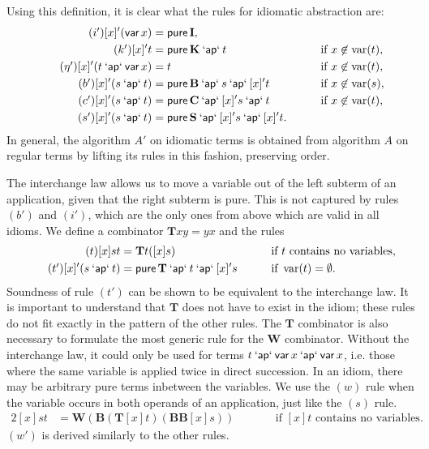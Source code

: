 Using this definition, it is clear what the rules for idiomatic abstraction
are:
\begin{alignat}{2}
	\tag{$i'$} [x]'(\operatorname{\mathsf{var}} x) &= \operatorname{\mathsf{pure}} \mathbf{I}, && \\
	\tag{$k'$} [x]'t &= \operatorname{\mathsf{pure}} \mathbf{K} \mathbin{\mathsf{`ap`}} t &&\qquad\text{if } x \not\in \operatorname{var}(t), \\
	\tag{$\eta'$} [x]'(t \mathbin{\mathsf{`ap`}} \operatorname{\mathsf{var}} x) &= t &&\qquad\text{if } x \not\in\operatorname{var}(t), \\
	\tag{$b'$} [x]'(s \mathbin{\mathsf{`ap`}} t) &= \operatorname{\mathsf{pure}} \mathbf{B} \mathbin{\mathsf{`ap`}} s \mathbin{\mathsf{`ap`}} [x]'t &&\qquad\text{if } x \not\in \operatorname{var}(s), \\
	\tag{$c'$} [x]'(s \mathbin{\mathsf{`ap`}} t) &= \operatorname{\mathsf{pure}} \mathbf{C} \mathbin{\mathsf{`ap`}} [x]'s \mathbin{\mathsf{`ap`}} t &&\qquad\text{if } x \not\in \operatorname{var}(t), \\
	\tag{$s'$} [x]'(s \mathbin{\mathsf{`ap`}} t) &= \operatorname{\mathsf{pure}} \mathbf{S} \mathbin{\mathsf{`ap`}} [x]'s \mathbin{\mathsf{`ap`}} [x]'t. &&
\end{alignat}
In general, the algorithm $A'$ on idiomatic terms is obtained from algorithm
$A$ on regular terms by lifting its rules in this fashion, preserving order.

The interchange law allows us to move a variable out of the left subterm of
an application, given that the right subterm is pure.
This is not captured by rules $(b')$ and $(i')$, which are the only ones from
above which are valid in all idioms.
We define a combinator $\mathbf{T}xy = yx$ and the rules
\begin{alignat}{2}
	\tag{$t$} [x]st &= \mathbf{T}t([x]s) &&\qquad\text{if $t$ contains no variables}, \\
	\tag{$t'$} [x]'(s \mathbin{\mathsf{`ap`}} t) &= \operatorname{\mathsf{pure}} \mathbf{T} \mathbin{\mathsf{`ap`}} t \mathbin{\mathsf{`ap`}} [x]'s
		&&\qquad\text{if } \operatorname{var}(t) = \emptyset.
\end{alignat}
Soundness of rule $(t')$ can be shown to be equivalent to the interchange law.
It is important to understand that $\mathbf{T}$ does not have to exist in the
idiom; these rules do not fit exactly in the pattern of the other rules.
The $\mathbf{T}$ combinator is also necessary to formulate the most generic
rule for the $\mathbf{W}$ combinator.
Without the interchange law, it could only be used for terms
$t \mathbin{\mathsf{`ap`}} \operatorname{\mathsf{var}} x \mathbin{\mathsf{`ap`}} \operatorname{\mathsf{var}} x$, i.e. those where the same variable is applied
twice in direct succession.
In an idiom, there may be arbitrary pure terms inbetween the variables.
We use the $(w)$ rule when the variable occurs in both operands of an application,
just like the $(s)$ rule.
\begin{alignat}{2}
	\tag{$w$} [x]st &= \mathbf{W}(\mathbf{B}(\mathbf{T}[x]t)(\mathbf{B}\mathbf{B}[x]s))
		&&\qquad\text{if $[x]t$ contains no variables}.
\end{alignat}
$(w')$ is derived similarly to the other rules.

